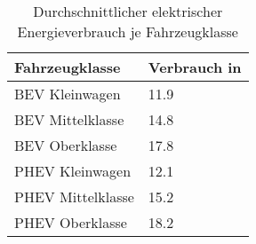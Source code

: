 {
\renewcommand{\arraystretch}{1.2}%
\begin{table}[H]
	\begin{center}
		\caption{Durchschnittlicher elektrischer Energieverbrauch je Fahrzeugklasse}
		\begin{tabu} to 0.6\textwidth {X[1] X[1.2, r]}
			\toprule
			Fahrzeugklasse    & Verbrauch in \si{\kwhkm} \\ \midrule
			BEV Kleinwagen    & \num{11.9}              \\
			BEV Mittelklasse  & \num{14.8}              \\
			BEV Oberklasse    & \num{17.8}              \\
			PHEV Kleinwagen   & \num{12.1}              \\
			PHEV Mittelklasse & \num{15.2}              \\
			PHEV Oberklasse   & \num{18.2}              \\ \bottomrule
		\end{tabu}
		\label{tab:TechVerbrauch}
	\end{center}
	\vspace{-3mm}%
\end{table}
}